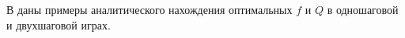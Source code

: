 В  даны примеры аналитического нахождения оптимальных $f$ и $Q$ в одношаговой и двухшаговой играх.

% 




